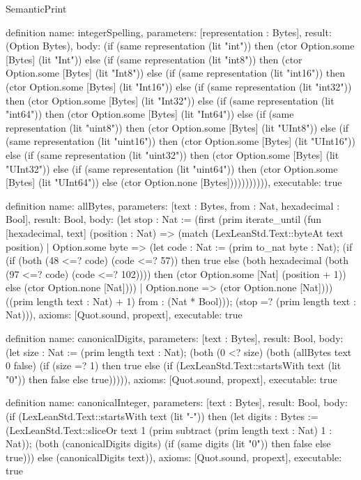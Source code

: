 \begin{lexlean}{SemanticPrint}
\begin{semanticmodule}
definition{
  name: integerSpelling,
  parameters: [representation : Bytes],
  result: (Option Bytes),
  body: (if (same representation (lit "int")) then (ctor Option.some [Bytes] (lit "Int")) else (if (same representation (lit "int8")) then (ctor Option.some [Bytes] (lit "Int8")) else (if (same representation (lit "int16")) then (ctor Option.some [Bytes] (lit "Int16")) else (if (same representation (lit "int32")) then (ctor Option.some [Bytes] (lit "Int32")) else (if (same representation (lit "int64")) then (ctor Option.some [Bytes] (lit "Int64")) else (if (same representation (lit "uint8")) then (ctor Option.some [Bytes] (lit "UInt8")) else (if (same representation (lit "uint16")) then (ctor Option.some [Bytes] (lit "UInt16")) else (if (same representation (lit "uint32")) then (ctor Option.some [Bytes] (lit "UInt32")) else (if (same representation (lit "uint64")) then (ctor Option.some [Bytes] (lit "UInt64")) else (ctor Option.none [Bytes])))))))))),
  executable: true
}

definition{
  name: allBytes,
  parameters: [text : Bytes, from : Nat, hexadecimal : Bool],
  result: Bool,
  body: (let stop : Nat := (first (prim iterate_until (fun [hexadecimal, text] (position : Nat) => (match (LexLeanStd.Text::byteAt text position)
    | Option.some byte => (let code : Nat := (prim to_nat byte : Nat); (if (if (both (48 <=? code) (code <=? 57)) then true else (both hexadecimal (both (97 <=? code) (code <=? 102)))) then (ctor Option.some [Nat] (position + 1)) else (ctor Option.none [Nat])))
    | Option.none => (ctor Option.none [Nat]))) ((prim length text : Nat) + 1) from : (Nat * Bool))); (stop =? (prim length text : Nat))),
  axioms: [Quot.sound, propext],
  executable: true
}

definition{
  name: canonicalDigits,
  parameters: [text : Bytes],
  result: Bool,
  body: (let size : Nat := (prim length text : Nat); (both (0 <? size) (both (allBytes text 0 false) (if (size =? 1) then true else (if (LexLeanStd.Text::startsWith text (lit "0")) then false else true))))),
  axioms: [Quot.sound, propext],
  executable: true
}

definition{
  name: canonicalInteger,
  parameters: [text : Bytes],
  result: Bool,
  body: (if (LexLeanStd.Text::startsWith text (lit "-")) then (let digits : Bytes := (LexLeanStd.Text::sliceOr text 1 (prim subtract (prim length text : Nat) 1 : Nat)); (both (canonicalDigits digits) (if (same digits (lit "0")) then false else true))) else (canonicalDigits text)),
  axioms: [Quot.sound, propext],
  executable: true
}


\end{semanticmodule}
\end{lexlean}
